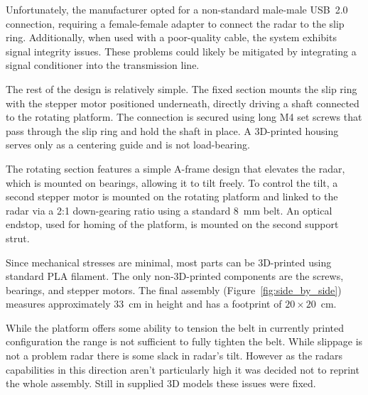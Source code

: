 Unfortunately, the manufacturer opted for a non-standard male-male USB~2.0 connection, requiring a female-female adapter to connect the radar to the slip ring.
Additionally, when used with a poor-quality cable, the system exhibits signal integrity issues.
These problems could likely be mitigated by integrating a signal conditioner into the transmission line.

The rest of the design is relatively simple.
The fixed section mounts the slip ring with the stepper motor positioned underneath, directly driving a shaft connected to the rotating platform.
The connection is secured using long M4 set screws that pass through the slip ring and hold the shaft in place.
A 3D-printed housing serves only as a centering guide and is not load-bearing.

The rotating section features a simple A-frame design that elevates the radar, which is mounted on bearings, allowing it to tilt freely.
To control the tilt, a second stepper motor is mounted on the rotating platform and linked to the radar via a 2:1 down-gearing ratio using a standard 8~mm belt.
An optical endstop, used for homing of the platform, is mounted on the second support strut.

Since mechanical stresses are minimal, most parts can be 3D-printed using standard PLA filament.
The only non-3D-printed components are the screws, bearings, and stepper motors.
The final assembly (Figure~\ref{fig:side_by_side}) measures approximately 33~cm in height and has a footprint of $20\times20$~cm.

While the platform offers some ability to tension the belt in currently printed configuration the range is not sufficient to fully tighten the belt.
While slippage is not a problem radar there is some slack in radar's tilt.
However as the radars capabilities in this direction aren't particularly high it was decided not to reprint the whole assembly.
Still in supplied 3D models these issues were fixed.

